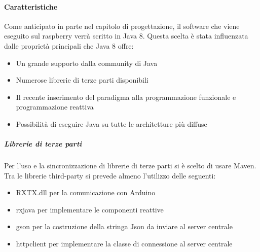 \documentclass[12pt]{article}
\begin{document}
\paragraph{Caratteristiche}
Come anticipato in parte nel capitolo di progettazione, il software che viene eseguito sul raspberry verrà scritto in Java 8. Questa scelta è stata influenzata dalle proprietà principali che Java 8 offre:
\begin{itemize}
\item Un grande supporto dalla community di Java
\item Numerose librerie di terze parti disponibili
\item Il recente inserimento del paradigma alla programmazione funzionale e programmazione reattiva
\item Possibilità di eseguire Java su tutte le architetture più diffuse
\end{itemize}
\subparagraph{Librerie di terze parti}
Per l'uso e la sincronizzazione di librerie di terze parti si è scelto di usare Maven.
Tra le librerie third-party si prevede almeno l'utilizzo delle seguenti:
\begin{itemize}
\item RXTX.dll per la comunicazione con Arduino
\item rxjava per implementare le componenti reattive
\item gson per la costruzione della stringa Json da inviare al server centrale
\item httpclient per implementare la classe di connessione al server centrale
\end{itemize}
\end{document}
